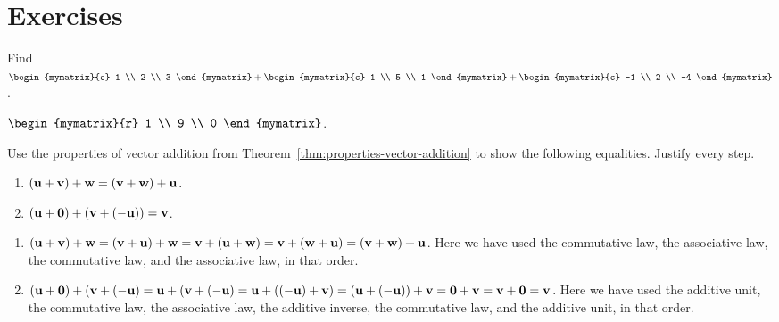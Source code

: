 \section*{Exercises}

\begin{enumialphparenastyle}

\begin{ex}
  Find $\begin{mymatrix}{c}
    1 \\
    2 \\
    3
  \end{mymatrix} +\begin{mymatrix}{c}
    1 \\
    5 \\
    1
  \end{mymatrix} +\begin{mymatrix}{c}
    -1 \\
    2 \\
    -4
  \end{mymatrix}$.
  
  \begin{sol}
    $\begin{mymatrix}{r}
      1 \\
      9 \\
      0
    \end{mymatrix}$.
  \end{sol}
\end{ex}

\begin{ex}
  Use the properties of vector addition from
  Theorem~\ref{thm:properties-vector-addition} to show the following
  equalities. Justify every step. 
  \begin{enumerate}
  \item $(\mbox{\bf u}+\mbox{\bf v})+\mbox{\bf w} = (\mbox{\bf v}+\mbox{\bf w})+\mbox{\bf u}$.
  \item $(\mbox{\bf u}+\mbox{\bf 0})+(\mbox{\bf v}+(-\mbox{\bf u})) = \mbox{\bf v}$.
  \end{enumerate}

  \begin{sol}
    \begin{enumerate}
    \item
      $(\mbox{\bf u}+\mbox{\bf v})+\mbox{\bf w} = (\mbox{\bf v}+\mbox{\bf u})+\mbox{\bf w} =
      \mbox{\bf v}+(\mbox{\bf u}+\mbox{\bf w}) = \mbox{\bf v}+(\mbox{\bf w}+\mbox{\bf u}) =
      (\mbox{\bf v}+\mbox{\bf w})+\mbox{\bf u}$. Here we have used the commutative
      law, the associative law, the commutative law, and the
      associative law, in that order.
    \item
      $(\mbox{\bf u}+\mbox{\bf 0})+(\mbox{\bf v}+(-\mbox{\bf u}) =
      \mbox{\bf u}+(\mbox{\bf v}+(-\mbox{\bf u}) = \mbox{\bf u}+((-\mbox{\bf u})+\mbox{\bf v})
      = (\mbox{\bf u}+(-\mbox{\bf u}))+\mbox{\bf v} = \mbox{\bf 0}+\mbox{\bf v} =
      \mbox{\bf v}+\mbox{\bf 0} = \mbox{\bf v}$. Here we have used the additive
      unit, the commutative law, the associative law, the additive
      inverse, the commutative law, and the additive unit, in that
      order.
    \end{enumerate}
  \end{sol}
\end{ex}

\end{enumialphparenastyle}
